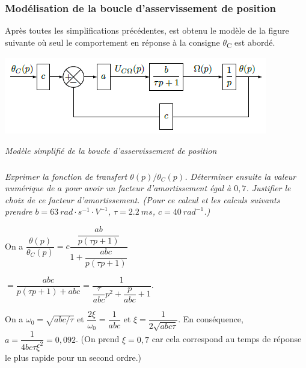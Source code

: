 \documentclass[10pt,fleqn]{article} %
\begin{document}
\begin{multicols}{2}
\subsubsection*{Modélisation de la boucle d'asservissement de position}

Après toutes les simplifications précédentes, est obtenu le modèle de la
figure suivante où seul le comportement en réponse à la consigne
$\theta$\textsubscript{C} est abordé.


\begin{center}
\includegraphics[width=\linewidth]{images/image15.png}

\textit{Modèle simplifié de la boucle d'asservissement de
position \label{fig14}}
\end{center}


\subparagraph{}\textit{Exprimer la fonction de transfert $\theta(p)/\theta_C(p)$.
  Déterminer ensuite la valeur numérique de $a$ pour avoir un facteur
  d'amortissement égal à $0,7$. Justifier le choix de ce facteur
  d'amortissement. (Pour ce calcul et les calculs suivants prendre $b =
  \SI{63}{rad\cdot s^{-1}\cdot V^{-1}}$, $\tau= \SI{2,2}{ms}$, $c = \SI{40}{rad^{-1}}$.)}

\ifprof
\begin{corrige}
On a $\dfrac{\theta(p)}{\theta_C(p)}=c\dfrac{\dfrac{ab}{p\left( \tau p + 1\right)}}{1+\dfrac{abc}{p\left( \tau p + 1\right)}}$

$=\dfrac{{abc}}{p\left( \tau p + 1\right)+{abc}}=\dfrac{1}{ \dfrac{\tau}{abc} p^2 + \dfrac{p}{abc}+1}$.

On a $\omega_0 = \sqrt{abc/\tau}$ et $\dfrac{2\xi}{\omega_0}=\dfrac{1}{abc}$ et 
$\xi=\dfrac{1}{2\sqrt{abc\tau}}$. 
En conséquence, ${a}=\dfrac{1}{4bc\tau\xi^2}=0,092$. (On prend $\xi=0,7$ car cela correspond au temps de réponse le plus rapide pour un second ordre.)
\end{corrige}
\else
\fi
  


\end{multicols}
\end{document}
